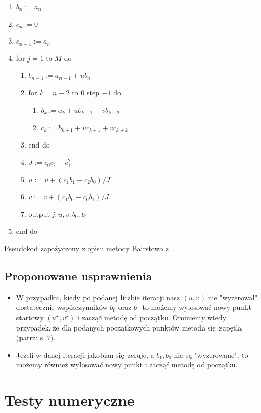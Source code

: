 \documentclass{article}
\begin{document}
\begin{enumerate}
\item $b_n := a_n$
\item $c_n := 0$
\item $c_{n-1} := a_n$
\item for $j = 1$ to $M$ do
	\begin{enumerate}
	\item $b_{n-1} := a_{n-1} + ub_n$
	\item for $k = n-2$ to $0$ step $-1$ do
		\begin{enumerate}
		\item $b_k := a_k + ub_{k+1} + vb_{k+2}$
		\item $c_k := b_{k+1} + uc_{k+1} + vc_{k+2}$
		\end{enumerate}
	\item end do

\item $J := c_0c_2 - c_1^2$
\item $u := u + (c_1b_1 - c_2b_0)/J$
\item $v := v + (c_1b_0 - c_0b_1)/J$
\item output $j, u, v, b_0, b_1$
\end{enumerate}
\item end do	
\end{enumerate}

Pseudokod zapożyczony z opisu metody Bairstowa z \cite{kincaid}.

\subsection{Proponowane usprawnienia}

\begin{itemize}
\item W przypadku, kiedy po podanej liczbie iteracji nasz $(u, v)$ nie "wyzerował" dostatecznie współczynników $b_0$ oraz $b_1$ to możemy wylosować nowy punkt startowy $(u^{\star}, v^{\star})$ i zacząć metodę od początku. Ominiemy wtedy przypadek, że dla podanych początkowych punktów metoda się zapętla (patrz: s. $7$).

\item Jeżeli w danej iteracji jakobian się zeruje, a $b_1, b_0$ nie są "wyzerowane", to możemy również wylosować nowy punkt i zacząć metodę od początku.
	
\end{itemize}



\section{Testy numeryczne}
\end{document}

